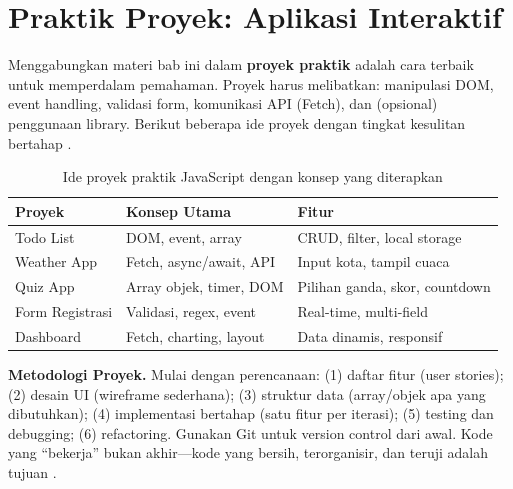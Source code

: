 ﻿\section{Praktik Proyek: Aplikasi Interaktif}

Menggabungkan materi bab ini dalam \textbf{proyek praktik} adalah cara terbaik untuk memperdalam pemahaman. Proyek harus melibatkan: manipulasi DOM, event handling, validasi form, komunikasi API (Fetch), dan (opsional) penggunaan library. Berikut beberapa ide proyek dengan tingkat kesulitan bertahap \cite{mdnJsGuide}.

\begin{table}[H]
\centering
\begin{tabular}{|P{3.5cm}|P{3.5cm}|P{5cm}|}
\hline
\textbf{Proyek} & \textbf{Konsep Utama} & \textbf{Fitur} \\
\hline
Todo List & DOM, event, array & CRUD, filter, local storage \\
\hline
Weather App & Fetch, async/await, API & Input kota, tampil cuaca \\
\hline
Quiz App & Array objek, timer, DOM & Pilihan ganda, skor, countdown \\
\hline
Form Registrasi & Validasi, regex, event & Real-time, multi-field \\
\hline
Dashboard & Fetch, charting, layout & Data dinamis, responsif \\
\hline
\end{tabular}
\caption{Ide proyek praktik JavaScript dengan konsep yang diterapkan}
\end{table}

\begin{konsep}
\textbf{Metodologi Proyek.} Mulai dengan perencanaan: (1) daftar fitur (user stories); (2) desain UI (wireframe sederhana); (3) struktur data (array/objek apa yang dibutuhkan); (4) implementasi bertahap (satu fitur per iterasi); (5) testing dan debugging; (6) refactoring. Gunakan Git untuk version control dari awal. Kode yang ``bekerja'' bukan akhir---kode yang bersih, terorganisir, dan teruji adalah tujuan \cite{mdnToolsTesting}.
\end{konsep}

